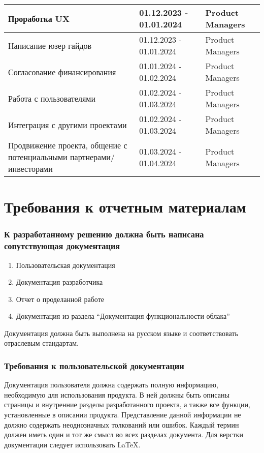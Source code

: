 \documentclass[14pt, a4paper]{extarticle}
\begin{document}
\begin{center}
\begin{longtable}{|D{0.4\textwidth}|D{0.2\textwidth}|D{0.3\textwidth}|}
\hline
Проработка UX & 01.12.2023 - 01.01.2024 & Product Managers \\
\hline
Написание юзер гайдов & 01.12.2023 - 01.01.2024 & Product Managers \\
\hline
Согласование финансирования & 01.01.2024 - 01.02.2024 & Product Managers \\
\hline
Работа с пользователями & 01.02.2024 - 01.03.2024 & Product Managers \\
\hline
Интеграция с другими проектами & 01.02.2024 - 01.03.2024 & Product Managers \\
\hline
Продвижение проекта, общение с потенциальными партнерами/инвесторами & 01.03.2024 - 01.04.2024 & Product Managers \\
\hline
\end{longtable}
\end{center}

\pagebreak

\section{Требования к отчетным материалам}

\subsubsection*{К разработанному решению должна быть написана сопутствующая документация}

\begin{enumerate}
\item Пользовательская документация
\item Документация разработчика
\item Отчет о проделанной работе
\item Документация из раздела “Документация функциональности облака”
\end{enumerate}

Документация должна быть выполнена на русском языке и соответствовать отраслевым стандартам.

\subsubsection*{Требования к пользовательской документации}

Документация пользователя должна содержать полную информацию, необходимую для использования продукта. В ней должны быть описаны страницы и внутренние разделы разработанного проекта, а также все функции, установленные в описании продукта. Представление данной информации не должно содержать неоднозначных толкований или ошибок. Каждый термин должен иметь один и тот же смысл во всех разделах документа.
Для верстки документации следует использовать LaTeX.
\end{document}
